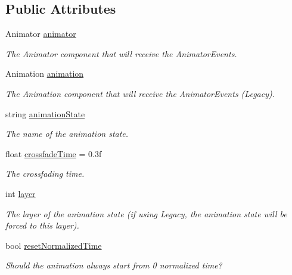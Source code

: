 \subsection*{Public Attributes}
\begin{DoxyCompactItemize}
\item 
Animator \mbox{\hyperlink{class_root_motion_1_1_final_i_k_1_1_interaction_object_1_1_animator_event_a8292f3ed59622864278132839d0416a4}{animator}}
\begin{DoxyCompactList}\small\item\em The Animator component that will receive the Animator\+Events. \end{DoxyCompactList}\item 
Animation \mbox{\hyperlink{class_root_motion_1_1_final_i_k_1_1_interaction_object_1_1_animator_event_a78194414c4a3c786ea58fdaa813d4fc6}{animation}}
\begin{DoxyCompactList}\small\item\em The Animation component that will receive the Animator\+Events (Legacy). \end{DoxyCompactList}\item 
string \mbox{\hyperlink{class_root_motion_1_1_final_i_k_1_1_interaction_object_1_1_animator_event_aae0a18c1ca5778c3485984bcd617d7a5}{animation\+State}}
\begin{DoxyCompactList}\small\item\em The name of the animation state. \end{DoxyCompactList}\item 
float \mbox{\hyperlink{class_root_motion_1_1_final_i_k_1_1_interaction_object_1_1_animator_event_a86c0a436b347502c724c26e4ce929ea3}{crossfade\+Time}} = 0.\+3f
\begin{DoxyCompactList}\small\item\em The crossfading time. \end{DoxyCompactList}\item 
int \mbox{\hyperlink{class_root_motion_1_1_final_i_k_1_1_interaction_object_1_1_animator_event_ab9fe41b77f0f276c1df823dff74988bd}{layer}}
\begin{DoxyCompactList}\small\item\em The layer of the animation state (if using Legacy, the animation state will be forced to this layer). \end{DoxyCompactList}\item 
bool \mbox{\hyperlink{class_root_motion_1_1_final_i_k_1_1_interaction_object_1_1_animator_event_aa4b2d2b6eb5f378d75a422d8aeaa4c3b}{reset\+Normalized\+Time}}
\begin{DoxyCompactList}\small\item\em Should the animation always start from 0 normalized time? \end{DoxyCompactList}\end{DoxyCompactItemize}


